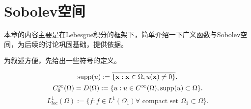 \chapter{Sobolev空间}
本章的内容主要是在Lebesgue积分的框架下，简单介绍一下广义函数与Sobolev空间，为后续的讨论巩固基础，提供依据。

为叙述方便，先给出一些符号的定义。
\begin{definition} 
    \begin{equation}
        \text{supp}(u):=\overline{\{\mathbf{x}:\mathbf{x}\in\Omega,u(\mathbf{x})\neq 0\}}.
    \end{equation}
    \begin{equation}
        C_{0}^{\infty}(\Omega)=D(\Omega):=\{u:u\in C^{\infty}(\Omega),\text{supp}(u)\subset\Omega\}.
    \end{equation}
    \begin{equation}
        L_{loc}^{1}(\Omega):=\{f:f\in L^{1}(\Omega_{1})\forall\text{ compact set }\Omega_{1}\subset\Omega\}.
    \end{equation}
\end{definition}
